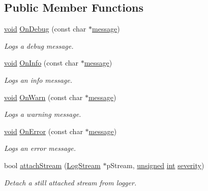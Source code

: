 \subsection*{Public Member Functions}
\begin{DoxyCompactItemize}
\item 
\hyperlink{wglew_8h_aeea6e3dfae3acf232096f57d2d57f084}{void} \hyperlink{class_assimp_1_1_null_logger_af354ebbd382b7097a55d364794a45631}{On\-Debug} (const char $\ast$\hyperlink{glew_8h_a76333d9470ffdd4811326932394d36da}{message})
\begin{DoxyCompactList}\small\item\em Logs a debug message. \end{DoxyCompactList}\item 
\hyperlink{wglew_8h_aeea6e3dfae3acf232096f57d2d57f084}{void} \hyperlink{class_assimp_1_1_null_logger_a12d2b0048d17a819c8c00277ad1394c5}{On\-Info} (const char $\ast$\hyperlink{glew_8h_a76333d9470ffdd4811326932394d36da}{message})
\begin{DoxyCompactList}\small\item\em Logs an info message. \end{DoxyCompactList}\item 
\hyperlink{wglew_8h_aeea6e3dfae3acf232096f57d2d57f084}{void} \hyperlink{class_assimp_1_1_null_logger_a9a04c2b9e3d4bc9eec8f693ed8115f24}{On\-Warn} (const char $\ast$\hyperlink{glew_8h_a76333d9470ffdd4811326932394d36da}{message})
\begin{DoxyCompactList}\small\item\em Logs a warning message. \end{DoxyCompactList}\item 
\hyperlink{wglew_8h_aeea6e3dfae3acf232096f57d2d57f084}{void} \hyperlink{class_assimp_1_1_null_logger_a4fbf66103757fafcff891fb04b4ee714}{On\-Error} (const char $\ast$\hyperlink{glew_8h_a76333d9470ffdd4811326932394d36da}{message})
\begin{DoxyCompactList}\small\item\em Logs an error message. \end{DoxyCompactList}\item 
bool \hyperlink{class_assimp_1_1_null_logger_a31c05ecaee392b5fd34fd2dfd1cca559}{attach\-Stream} (\hyperlink{class_assimp_1_1_log_stream}{Log\-Stream} $\ast$p\-Stream, \hyperlink{_free_image_8h_a425076c7067a1b5166e2cc530e914814}{unsigned} \hyperlink{wglew_8h_a500a82aecba06f4550f6849b8099ca21}{int} \hyperlink{glew_8h_acc39d4387d4f2d172de77ed0c5208990}{severity})
\begin{DoxyCompactList}\small\item\em Detach a still attached stream from logger. \end{DoxyCompactList}\item 

\end{DoxyCompactItemize}
